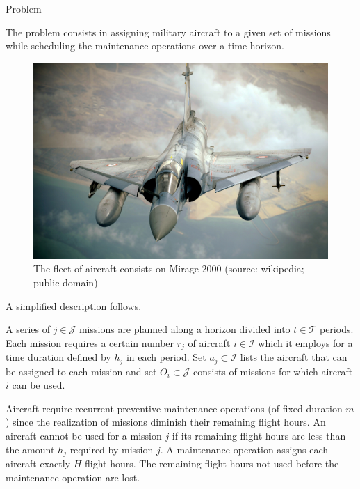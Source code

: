 \documentclass[final]{beamer}
\newlength{\onecolwid}
\begin{document}
\begin{frame}[t]
\begin{columns}[t]
\begin{column}{\onecolwid}

		\begin{block}{Problem}

		    The problem consists in assigning military aircraft to a given set of missions while scheduling the maintenance operations over a time horizon.

			\begin{figure}
				\includegraphics[width=1\linewidth]{img/mirage2000.jpg}
			\caption{The fleet of aircraft consists on Mirage 2000 (source: wikipedia; public domain)}
			\end{figure}

			A simplified description follows.

		    A series of $j \in \mathcal{J}$ missions are planned along a horizon divided into $t \in \mathcal{T}$ periods. Each mission requires a certain number $r_{j}$ of aircraft $i \in \mathcal{I}$ which it employs for a time duration defined by $h_j$ in each period. Set $a_{j} \subset \mathcal{I}$ lists the aircraft that can be assigned to each mission and set $O_i \subset \mathcal{J}$ consists of missions for which aircraft $i$ can be used.

		    Aircraft require recurrent preventive maintenance operations (of fixed duration $m$) since the realization of missions diminish their remaining flight hours. An aircraft cannot be used for a mission $j$ if its remaining flight hours are less than the amount $h_j$ required by mission $j$. A maintenance operation assigns each aircraft exactly $H$ flight hours. The remaining flight hours not used before the maintenance operation are lost. 



\end{block}
\end{column}
\end{columns}
\end{frame}
\end{document}
